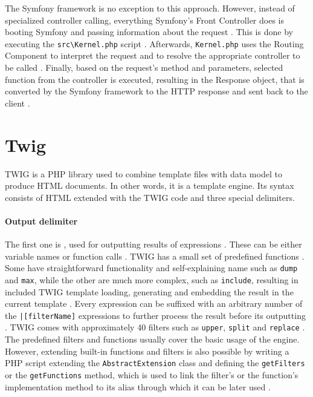 The Symfony framework is no exception to this approach. However, instead of specialized controller calling, everything Symfony's Front Controller does is booting Symfony and passing information about the request \citep{symfony.reference}. This is done by executing the \texttt{src\textbackslash{}Kernel.php} script \citep{symfony.reference}. Afterwards, \texttt{Kernel.php} uses the Routing Component to interpret the request and to resolve the appropriate controller to be called \citep{symfony.reference}. Finally, based on the request's method and parameters, selected function from the controller is executed, resulting in the Response object, that is converted by the Symfony framework to the HTTP response and sent back to the client \citep{symfony.reference}.




\section{Twig}
TWIG is a PHP library used to combine template files with data model to produce HTML documents. In other words, it is a template engine. Its syntax consists of HTML extended with the TWIG code and three special delimiters. 

\paragraph{Output delimiter}
The first one is \texttt{}, used for outputting results of expressions \citep{twig.docs}. These can be either variable names or function calls \citep{twig.docs}. TWIG has a small set of predefined functions \citep{twig.docs}. Some have straightforward functionality and self-explaining name such as \texttt{dump} and \texttt{max}, while the other are much more complex, such as \texttt{include}, resulting in included TWIG template loading, generating and embedding the result in the current template \citep{twig.docs}. Every expression can be suffixed with an arbitrary number of the \texttt{|[filterName]} expressions to further process the result before its outputting \citep{twig.docs}. TWIG comes with approximately 40 filters such as \texttt{upper}, \texttt{split} and \texttt{replace} \citep{twig.docs}. The predefined filters and functions usually cover the basic usage of the engine. However, extending built-in functions and filters is also possible by writing a PHP script extending the \texttt{AbstractExtension} class and defining the \texttt{getFilters} or the \texttt{getFunctions} method, which is used to link the filter's or the function's implementation method to its alias through which it can be later used \citep{twig.docs}. 


